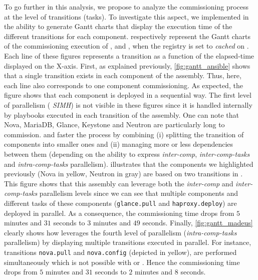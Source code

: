 To go further in this analysis, we propose to analyze the
commissioning process at the level of transitions (\ie tasks). To
investigate this aspect, we implemented in \mad the ability to
generate Gantt charts that display the execution time of the different
transitions for each component.
respectively represent the Gantt charts of the commissioning execution
of \ansass, \aeoass and \madass, when the registry is set to
\emph{cached} on \ecotype. Each line of these figures represents a
transition as a function of the elapsed-time displayed on the X-axis.
First, as explained previously, \cref{fig:gantt_ansible} shows that a
single transition exists in each component of the \ansass
assembly. Thus, here, each line also corresponds to one component
commissioning. As expected, the figure shows that each component is
deployed in a sequential way. The first level of parallelism (\ie
\emph{SIMH}) is not visible in these figures since it is handled
internally by \ansible playbooks executed in each transition of the
assembly. One can note that Nova, MariaDB, Glance, Keystone and
Neutron are particularly long to commission. \aeoass and \madass
faster the process by combining (i) splitting the transition of
components into smaller ones and (ii) managing more or less
dependencies between them (depending on the ability to express
\emph{inter-comp}, \emph{inter-comp-tasks} and \emph{intra-comp-tasks}
parallelism).
%
 illustrates that the components we highlighted
previously (\eg Nova in yellow, Neutron in gray) are based on two
transitions in \aeoass. This figure shows that this assembly can
leverage both the \emph{inter-comp} and \emph{inter-comp-tasks}
parallelism levels since we can see that multiple components and
different tasks of these components (\eg \texttt{glance.pull} and
\texttt{haproxy.deploy}) are deployed in parallel. As a consequence,
the commissioning time drops from $5$ minutes and $31$ seconds to $3$
minutes and $49$ seconds.
%
Finally, \cref{fig:gantt_madeus} clearly shows how \mad leverages the
fourth level of parallelism (\ie \emph{intra-comp-tasks} parallelism)
by displaying multiple transitions executed in parallel. For instance,
transitions \texttt{nova.pull} and \texttt{nova.config} (depicted in
yellow), are performed simultaneously which is not possible with
\ansible or \aeolus. Hence the commissioning time drops from $5$
minutes and $31$ seconds to $2$ minutes and $8$ seconds.
%

